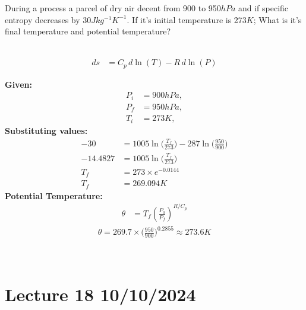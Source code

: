 \documentclass[fleqn,10pt]{SelfArx} %
\begin{document}
\begin{question}[\label=17.1]{During a process a parcel of dry air decent from 900 to 950$hPa$ and if specific entropy decreases by 30$Jkg^{-1}K^{-1}$. If it's initial temperature is 273$K$; What is it's final temperature and potential temperature?}
\Rightarrow {} \\  \\ 

    \begin{align*}
        ds &= C_p \, d\ln(T) - R \, d\ln(P)
    \end{align*}

    \textbf{Given:}
    \begin{align*}
        P_i&=900hPa, \\
        P_f&=950hPa, \\
        T_i&=273K,
    \end{align*}
    \textbf{Substituting values:}
    \begin{align*}
        -30&=1005 \ln\Big(\frac{T_f}{273}\Big) - 287 \ln\Big(\frac{950}{900}\Big) \\
        -14.4827&=1005 \ln\Big(\frac{T_f}{273}\Big) \\
        T_f&=273 \times e^{-0.0144} \\
        T_f&=269.094K
    \end{align*}
    \textbf{Potential Temperature:}
    \begin{align*}
        \theta &= T_f \left(\frac{P_0}{P_f}\right)^{R/C_p}
    \end{align*}
    \begin{align*}
        \theta = 269.7 \times \Big(\frac{950}{900}\Big)^{0.2855} \approx 273.6K
    \end{align*}

\therefore {}\\ 
\end{question}

\clearpage

\section{Lecture 18 10/10/2024}
\end{document}
